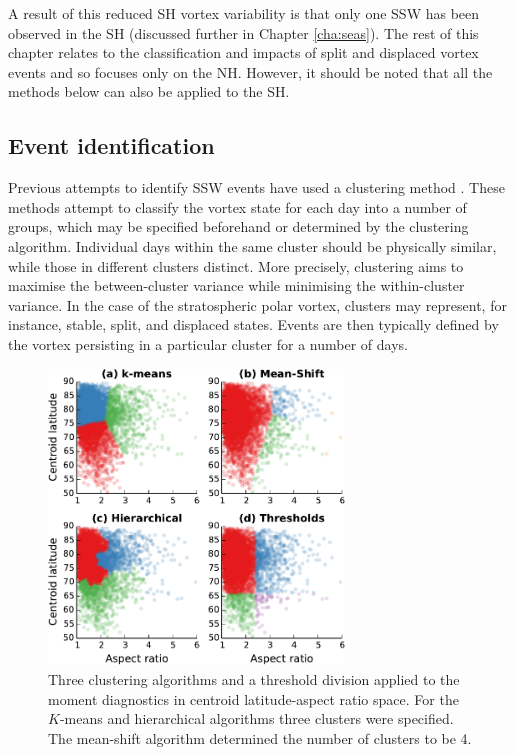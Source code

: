 A result of this reduced SH vortex variability is that only one SSW has been
observed in the SH (discussed further in Chapter \ref{cha:seas}). The rest of
this chapter relates to the classification and impacts of split and displaced
vortex events and so focuses only on the NH. However, it should be noted that
all the methods below can also be applied to the SH.


\subsection{Event identification}
\label{sec:event-definition}

Previous attempts to identify SSW events have used a clustering method
\citep{K.Coughlin2009,Hannachi2010}. These methods attempt to classify the
vortex state for each day into a number of groups, which may be specified
beforehand or determined by the clustering algorithm. Individual days within the
same cluster should be physically similar, while those in different clusters
distinct. More precisely, clustering aims to maximise the between-cluster
variance while minimising the within-cluster variance. In the case of the
stratospheric polar vortex, clusters may represent, for instance, stable, split,
and displaced states. Events are then typically defined by the vortex persisting
in a particular cluster for a number of days.

\begin{figure}
 \centering
 \noindent\includegraphics[width=0.7\textwidth]{figures/chapter-moments/clustering.pdf}
 \caption[Clustering algorithms applied to the moment diagnostics.]{Three
   clustering algorithms and a threshold division applied to the moment
   diagnostics in centroid latitude-aspect ratio space. For the $K$-means and
   hierarchical algorithms three clusters were specified. The mean-shift
   algorithm determined the number of clusters to be 4.}
 \label{fig:clusters}
\end{figure}

